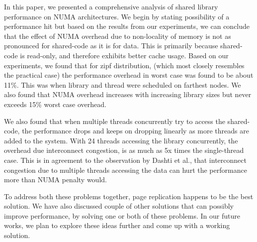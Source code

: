 
In this paper, we presented a comprehensive analysis of shared library performance
on NUMA architectures. We begin by stating possibility of a performance hit but based
on the results from our experiments, we can conclude that the effect of NUMA overhead
due to non-locality of memory is not as pronounced for shared-code as it is for data.
This is primarily because shared-code is read-only, and therefore exhibits better cache
usage. Based on our experiments, we found that for zipf distribution, 
(which most closely resembles the practical case) the
performance overhead in worst case was found to be about 11\%.
This was when library and thread were scheduled on farthest nodes. We also found that
NUMA overhead increases with increasing library sizes but never exceeds 15\% worst
case overhead.

We also found that when multiple threads concurrently try to access the shared-code,
the performance drops and keeps on dropping linearly as more threads are added to the
system. With 24 threads accessing the library concurrently, the overhead due interconnect
congestion, is as much as 5x times the single-thread case. This is in agreement to the
observation by Dashti et al.\cite{Dashti:2013:TMH:2490301.2451157}, that interconnect congestion
due to multiple threads accessing the data can hurt the performance more than NUMA penalty
would.

To address both these problems together, page replication happens to be the best solution.
We have also discussed couple of other solutions that can possibly improve performance, by
solving one or both of these problems. In our future works, we plan to explore these ideas
further and come up with a working solution.
